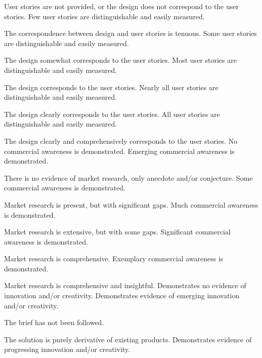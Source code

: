 \documentclass{../fal_assignment}
\begin{document}
\begin{markingrubric}
        \grade\fail User stories are not provided, or the design does not correspond to the user stories.
        \grade Few user stories are distinguishable and easily measured.
            \par The correspondence between design and user stories is tenuous.
        \grade Some user stories are distinguishable and easily measured.
            \par The design somewhat corresponds to the user stories.
        \grade Most user stories are distinguishable and easily measured.
            \par The design corresponds to the user stories.
        \grade Nearly all user stories are distinguishable and easily measured.
            \par The design clearly corresponds to the user stories.
        \grade All user stories are distinguishable and easily measured.
            \par The design clearly and comprehensively corresponds to the user stories.
        \grade\fail No commercial awareness is demonstrated.
        \grade Emerging commercial awareness is demonstrated.
            \par There is no evidence of market research, only anecdote and/or conjecture.
        \grade Some commercial awareness is demonstrated.
            \par Market research is present, but with significant gaps.
        \grade Much commercial awareness is demonstrated.
            \par Market research is extensive, but with some gaps.
        \grade Significant commercial awareness is demonstrated.
            \par Market research is comprehensive.
        \grade Exemplary commercial awareness is demonstrated.
            \par Market research is comprehensive and insightful.
        \grade\fail Demonstrates no evidence of innovation and/or creativity.
        \grade Demonstrates evidence of emerging innovation and/or creativity.
            \par The brief has not been followed.
            \par The solution is purely derivative of existing products.
        \grade Demonstrates evidence of progressing innovation and/or creativity.

\end{markingrubric}
\end{document}
